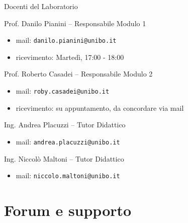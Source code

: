 \documentclass[presentation]{beamer}
\begin{document}
\begin{frame}{Docenti del Laboratorio}

\begin{block}{Prof. Danilo Pianini -- Responsabile Modulo 1}
\begin{itemize}
\item mail: \texttt{danilo.pianini@unibo.it}
\item ricevimento: Martedì, 17:00 - 18:00
\end{itemize}
\end{block}

\begin{block}{Prof. Roberto Casadei -- Responsabile Modulo 2}
\begin{itemize}
\item mail: \texttt{roby.casadei@unibo.it}
\item ricevimento: su appuntamento, da concordare via mail
\end{itemize}
\end{block}

\begin{block}{Ing. Andrea Placuzzi -- Tutor Didattico}
    \begin{itemize}
        \item mail: \texttt{andrea.placuzzi@unibo.it}
    \end{itemize}
\end{block}

\begin{block}{Ing. Niccolò Maltoni -- Tutor Didattico}
    \begin{itemize}
        \item mail: \texttt{niccolo.maltoni@unibo.it}
    \end{itemize}
\end{block}

\end{frame}

\section{Forum e supporto}
\end{document}

